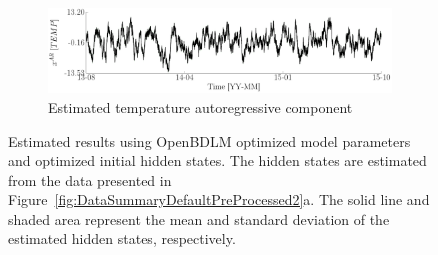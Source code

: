 \begin{figure}[h!]
\begin{subfigure}{\linewidth}
\end{subfigure}
\begin{subfigure}{\linewidth}
\includegraphics[width=0.9\linewidth]{./docfigs/Example_DISPTEMPSIM/optim_param_optim_initialhiddenstate/TEMP_AR_6.pdf} 
\caption{Estimated temperature autoregressive component}
\end{subfigure}
\caption{Estimated results using OpenBDLM optimized model parameters and optimized initial hidden states. The hidden states are estimated from the data presented in Figure~\ref{fig:DataSummaryDefaultPreProcessed2}a. The solid line and shaded area represent the mean and standard deviation of the estimated hidden states, respectively.}
\label{fig:DISPTEMPSIMOptimizedOptimizedExample2}
\end{figure}